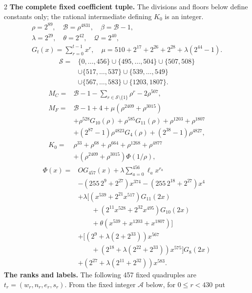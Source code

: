 \documentclass[10pt]{article}
\let\bigsum\sum
\renewcommand{\sum}{\bigsum\nolimits}
\newcommand{\rng}[2]{\{#1,\ldots,#2\}}
\begin{document}
\begin{multicols}{2}
\textbf{The complete fixed coefficient tuple.}
The divisions and floors below define constants only; the rational
intermediate defining $K_0$ is an integer.
\[
\begin{gathered}
\rho=2^{89},\quad\mathcal B=\rho^{4831},\quad\beta=\mathcal B-1,\\
\lambda=2^{29},\quad\theta=2^{42},\quad\mathcal Q=2^{40},\\
G_t(x)=\sum_{r=0}^{t-1}x^r,\quad
\mu=510+2^{17}+2^{26}+2^{28}+\lambda(2^{44}-1).
\end{gathered}
\]
\[
\begin{aligned}
\mathcal S={}&\rng0{456}\cup\rng{495}{504}\cup\{507,508\}\\
 &\cup\rng{517}{537}\cup\rng{539}{549}\\
 &\cup\rng{567}{583}\cup\{1203,1807\}.
\end{aligned}
\]
\[
\begin{aligned}
M_C={}&\mathcal B-1-\sum_{r\in\mathcal S\setminus\{1\}}\rho^r-2\rho^{507},\\
M_F={}&\mathcal B-1+4+\mu(\rho^{2409}+\rho^{3015})\\
 &+\rho^{528}G_{10}(\rho)+\rho^{585}G_{11}(\rho)+\rho^{1203}+\rho^{1807}\\
 &+(2^{87}-1)\rho^{4823}G_4(\rho)+(2^{38}-1)\rho^{4827},\\
K_0={}&\rho^{33}+\rho^{68}+\rho^{664}+\rho^{1268}+\rho^{4877}\\
 &+(\rho^{2409}+\rho^{3015})\Phi(1/\rho),
\end{aligned}
\]
\[
\begin{aligned}
\Phi(x)={}&O G_{457}(x)+\lambda\sum_{a=0}^{456}\ell_a x^{r_a}\\
 &-(255\,2^9+2^{27})x^{374}-(255\,2^{18}+2^{27})x^4\\
 &+\lambda\bigl[(x^{539}+2^{21}x^{517})G_{11}(2x)\\
 &\qquad +(2^{11}x^{528}+2^{32}x^{495})G_{10}(2x)\\
 &\qquad +\theta(x^{539}+x^{1203}+x^{1807})\bigr]\\
 &+\bigl[(2^9+\lambda(2+2^{33}))x^{567}\\
 &\qquad +(2^{18}+\lambda(2^{22}+2^{33}))x^{575}\bigr]G_8(2x)\\
 &+(2^{27}+\lambda(2^{11}+2^{32}))x^{583}.
\end{aligned}
\]
\textbf{The ranks and labels.}
The following 457 fixed quadruples are $t_r=(w_r,n_r,e_r,s_r)$.
From the fixed integer $\mathcal A$ below, for $0\le r<430$ put
\[
\begin{gathered}

\end{gathered}\]
\end{multicols}
\end{document}

